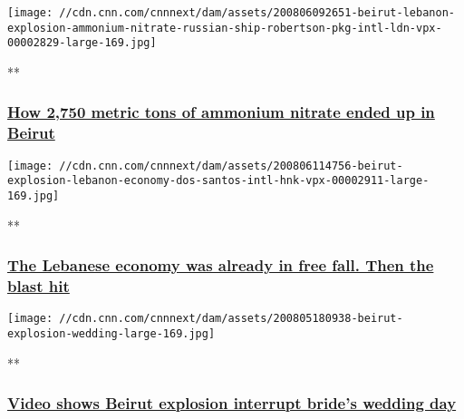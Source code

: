 \href{/videos/world/2020/08/06/beirut-lebanon-explosion-ammonium-nitrate-russian-ship-robertson-pkg-intl-ldn-vpx.cnn/video/playlists/around-the-world/}{}

\texttt{[image: //cdn.cnn.com/cnnnext/dam/assets/200806092651-beirut-lebanon-explosion-ammonium-nitrate-russian-ship-robertson-pkg-intl-ldn-vpx-00002829-large-169.jpg]}

**

\hypertarget{how-2750-metric-tons-of-ammonium-nitrate-ended-up-in-beirut}{%
\subsubsection{\texorpdfstring{\href{/videos/world/2020/08/06/beirut-lebanon-explosion-ammonium-nitrate-russian-ship-robertson-pkg-intl-ldn-vpx.cnn/video/playlists/around-the-world/}{How
2,750 metric tons of ammonium nitrate ended up in
Beirut}}{How 2,750 metric tons of ammonium nitrate ended up in Beirut}}\label{how-2750-metric-tons-of-ammonium-nitrate-ended-up-in-beirut}}

\href{/videos/business/2020/08/06/beirut-explosion-lebanon-economy-dos-santos-intl-hnk-vpx.cnn/video/playlists/around-the-world/}{}

\texttt{[image: //cdn.cnn.com/cnnnext/dam/assets/200806114756-beirut-explosion-lebanon-economy-dos-santos-intl-hnk-vpx-00002911-large-169.jpg]}

**

\hypertarget{the-lebanese-economy-was-already-in-free-fall-then-the-blast-hit}{%
\subsubsection{\texorpdfstring{\href{/videos/business/2020/08/06/beirut-explosion-lebanon-economy-dos-santos-intl-hnk-vpx.cnn/video/playlists/around-the-world/}{The
Lebanese economy was already in free fall. Then the blast
hit}}{The Lebanese economy was already in free fall. Then the blast hit}}\label{the-lebanese-economy-was-already-in-free-fall-then-the-blast-hit}}

\href{/videos/world/2020/08/05/beirut-explosion-wedding-video-zw-orig.cnn/video/playlists/around-the-world/}{}

\texttt{[image: //cdn.cnn.com/cnnnext/dam/assets/200805180938-beirut-explosion-wedding-large-169.jpg]}

**

\hypertarget{video-shows-beirut-explosion-interrupt-brides-wedding-day}{%
\subsubsection{\texorpdfstring{\href{/videos/world/2020/08/05/beirut-explosion-wedding-video-zw-orig.cnn/video/playlists/around-the-world/}{Video
shows Beirut explosion interrupt bride's wedding
day}}{Video shows Beirut explosion interrupt bride's wedding day}}\label{video-shows-beirut-explosion-interrupt-brides-wedding-day}}

